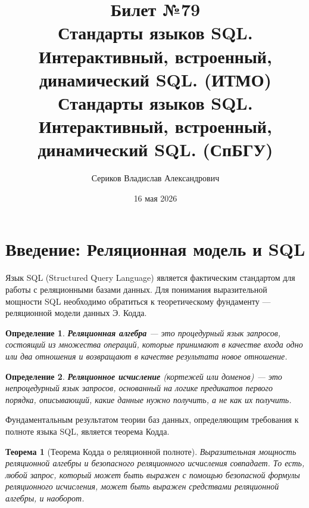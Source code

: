 \documentclass[12pt, a4paper]{article}
\title{Билет №79 \\ \small Стандарты языков SQL. Интерактивный, встроенный, динамический SQL. (ИТМО) \\ Стандарты языков SQL. Интерактивный, встроенный, динамический SQL. (СпБГУ)}
\author{Сериков Владислав Александрович}
\date{16 мая 2026}
\newtheorem{theorem}{Теорема}
\newtheorem{definition}{Определение}
\begin{document}
\maketitle
\tableofcontents
\newpage

\section{Введение: Реляционная модель и SQL}

Язык SQL (Structured Query Language) является фактическим стандартом для работы с реляционными базами данных. Для понимания выразительной мощности SQL необходимо обратиться к теоретическому фундаменту — реляционной модели данных Э. Кодда.

\begin{definition}
\textbf{Реляционная алгебра} — это процедурный язык запросов, состоящий из множества операций, которые принимают в качестве входа одно или два отношения и возвращают в качестве результата новое отношение.
\end{definition}

\begin{definition}
\textbf{Реляционное исчисление} (кортежей или доменов) — это непроцедурный язык запросов, основанный на логике предикатов первого порядка, описывающий, \textit{какие} данные нужно получить, а не \textit{как} их получить.
\end{definition}

Фундаментальным результатом теории баз данных, определяющим требования к полноте языка SQL, является теорема Кодда.

\begin{theorem}[Теорема Кодда о реляционной полноте]
Выразительная мощность реляционной алгебры и безопасного реляционного исчисления совпадает. То есть, любой запрос, который может быть выражен с помощью безопасной формулы реляционного исчисления, может быть выражен средствами реляционной алгебры, и наоборот.
\end{theorem}
\end{document}
